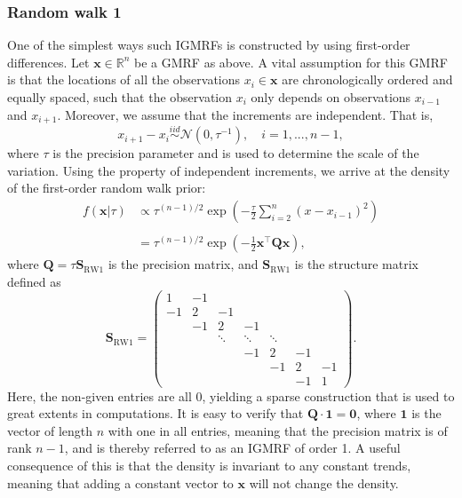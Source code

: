 \subsubsection{Random walk 1}
One of the simplest ways such IGMRFs is constructed by using first-order differences. Let $\pmb x\in\mathbb{R}^n$ be a GMRF as above. A vital assumption for this GMRF is that the locations of all the observations $x_i\in\pmb x$ are chronologically ordered and equally spaced, such that the observation $x_i$ only depends on observations $x_{i-1}$ and $x_{i+1}$. Moreover, we assume that the increments are independent. That is,
\begin{equation*}
    x_{i+1} - x_i \overset{iid}{\sim} \mathcal{N}(0, \tau^{-1}), \quad i = 1,...,n-1,
\end{equation*}
where $\tau$ is the precision parameter and is used to determine the scale of the variation. Using the property of independent increments, we arrive at the density of the first-order random walk prior: 
\begin{align*}
    f(\pmb x|\tau) & \propto \tau^{(n-1)/2}\exp\left( -\frac{\tau}{2}\sum_{i=2}^n(x - x_{i-1})^2 \right)\\\\
    & = \tau^{(n-1)/2}\exp\left( -\frac{1}{2}\pmb x^\top \pmb Q \pmb x \right),
\end{align*}
where $\pmb Q = \tau \pmb S_{\text{RW1}}$ is the precision matrix, and $\pmb S_{\text{RW1}}$ is the structure matrix defined as
\begin{equation}
    \pmb S_{\text{RW1}} = \begin{pmatrix}
        1 & -1 &  &  &  &&\\
        -1 & 2 & -1 &  &  &&\\
        & -1&  2& -1& \\
         & & \ddots& \ddots &\ddots & &  \\
         &&&-1&2&-1&\\
         & && & -1 & 2 & -1 \\
         & && &  & -1 & 1 
        \end{pmatrix}.
        \label{eqn:rw1-structure-matrix}
\end{equation}
Here, the non-given entries are all 0, yielding a sparse construction that is used to great extents in computations. It is easy to verify that $\pmb Q\cdot \pmb 1 = \pmb 0$, where $\pmb 1$ is the vector of length $n$ with one in all entries, meaning that the precision matrix is of rank $n-1$, and is thereby referred to as an IGMRF of order 1. A useful consequence of this is that the density is invariant to any constant trends, meaning that adding a constant vector to $\pmb x$ will not change the density.

